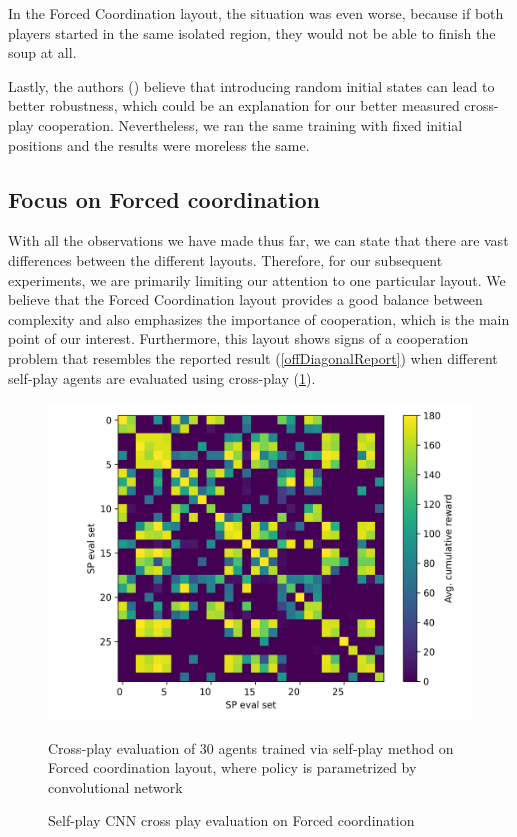 In the Forced Coordination layout, the situation was even worse, because if both players started in the same isolated region, they would not be able to finish the soup at all.

Lastly, the authors (\cite{knott2021evaluating}) believe that introducing random initial states can lead to better robustness, which could be an explanation for our better measured cross-play cooperation.
Nevertheless, we ran the same training with fixed initial positions and the results were moreless the same.

\subsection{Focus on Forced coordination}
With all the observations we have made thus far, we can state that there are vast differences between the different layouts. 
Therefore, for our subsequent experiments, we are primarily limiting our attention to one particular layout.
We believe that the Forced Coordination layout provides a good balance between complexity and also emphasizes the importance of cooperation, which is the main point of our interest.
Furthermore, this layout shows signs of a cooperation problem that resembles the reported result (\ref{offDiagonalReport}) when different self-play agents are evaluated using cross-play (\ref{ForcedCoordinationCNNSPCrossPlay}).

\begin{figure}[!ht]
  \centering
  \includegraphics*[width=14cm]{../img/Forced_coordination_CNN_SP_CrossPlay(5).png}
  \caption{Self-play CNN cross play evaluation on Forced coordination}
  \label{ForcedCoordinationCNNSPCrossPlay}
  \medskip
  \small 
  Cross-play evaluation of 30 agents trained via self-play method on Forced coordination layout, where policy is parametrized by convolutional network

\end{figure}